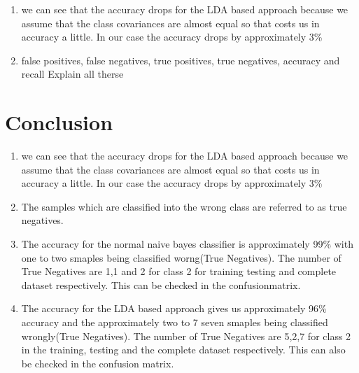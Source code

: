 \documentclass[10pt, letterpaper]{article}
\begin{document}
\begin{enumerate}
\item we can see that the accuracy drops for the LDA based approach because we assume that the class covariances are almost equal so that costs us in accuracy a little. In our case the accuracy drops by approximately 3\%

 \item false positives, false negatives, true positives, true negatives, accuracy and recall Explain all therse
\end{enumerate}

\section{Conclusion}

\begin{enumerate}
\item we can see that the accuracy drops for the LDA based approach because we assume that the class covariances are almost equal so that costs us in accuracy a little. In our case the accuracy drops by approximately 3\%

\item The samples which are classified into the wrong class are referred to as true negatives. 

\item The accuracy for the  normal naive bayes classifier is approximately 99\% with one to two smaples being classified worng(True Negatives). The number of True Negatives are 1,1 and 2 for class 2 for training testing and complete dataset respectively. This can be checked in the confusionmatrix.

\item The accuracy for the LDA based approach gives us approximately 96\% accuracy and the approximately two to 7 seven smaples being classified wrongly(True Negatives). The number of True Negatives are 5,2,7 for class 2 in the training, testing and the complete dataset respectively. This can also be checked in the confusion matrix.
\end{enumerate}
\end{document}
